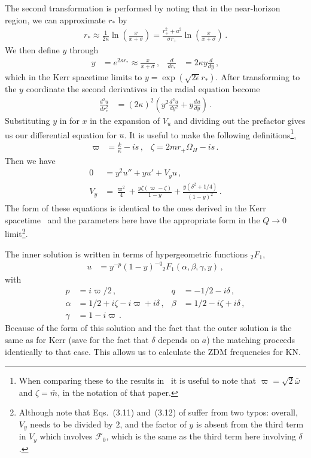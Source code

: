 \begin{refsection}
The second transformation is performed by noting that in the near-horizon region, we can approximate $r_*$ by
\begin{align}
r_* \approx \frac{1}{2\kappa}  \ln \left(\frac{x}{x+\sigma} \right) = \frac{r_+^2 +a^2}{\sigma r_+} \ln \left(\frac{x}{x+\sigma} \right) \,.
\end{align}
We then define $y$ through
\begin{align}
y & = e^{2 \kappa r_* } \approx \frac{x}{x+\sigma} \,, &
\frac{d}{dr_*} & = 2 \kappa y \frac{d}{dy} \,,
\end{align}
which in the Kerr spacetime limits to $y = \exp(\sqrt{2 \epsilon} r_*)$. 
After transforming to the $y$ coordinate the second derivatives in the radial equation become
\begin{align}
\frac{d^2 u}{dr_*^2} & = \left( 2 \kappa \right)^2 \left(y^2 \frac{d^2 u}{dy^2} + y \frac{d u}{dy} \right) \,.
\end{align}
Substituting $y$ in for $x$ in the expansion of $V_u$ and dividing out the prefactor gives us our differential equation for $u$. 
It is useful to make the following 
definitions\footnote{When comparing these to the results in~\cite{Yang:2013uba} it is useful to note that  $\varpi = \sqrt{2} \bar \omega$ and $\zeta = \bar m$, in the notation of that paper.},
\begin{align}
\varpi & = \frac{k}{\kappa}  - i s \,, &  \zeta = 2 m r_+  \Omega_H - i s \,.
\end{align}
Then we have
\begin{align}
\label{eq:NHdiffeq}
0 & = y^2  u'' + y u' + V_y u  \,, \\
\label{eq:Ypot}
 V_y & = \frac{\varpi^2}{4} + \frac{y \zeta (\varpi -\zeta)}{1-y} + \frac{y(\delta^2 + 1/4)}{(1-y)^2} \,.
\end{align}
The form of these equations is identical to the ones derived in the Kerr spacetime~\cite{Yang:2013uba} and the parameters here have the appropriate form in the $Q \to 0$ 
limit\footnote{Although note that Eqs.~(3.11) and~(3.12) of \cite{Yang:2013uba} suffer from two typos: overall, $V_y$ needs to be divided by $2$, and the factor of $y$ is absent from the third term in $V_y$ which involves $\mathcal F_0$, which is the same as the third term here involving $\delta$.}. 

The inner solution is written in terms of hypergeometric functions ${}_2 F_1$,
\begin{align}
\label{eq:NHsln}
u & = y^{-p} (1-y)^{-q} {}_2 F_1 ( \alpha, \beta, \gamma, y)\,,
\end{align}
with 
\begin{align}
p & = i \varpi/2 \,, & q & = -1/2-i\delta \,, \\
\alpha & = 1/2 + i \zeta - i \varpi + i \delta \,, & \beta & = 1/2 -i \zeta + i \delta \,, \\
\gamma & = 1 - i \varpi \,.
\end{align}
Because of the form of this solution and the fact that the outer solution is the same as for Kerr (save for the fact that $\delta$ depends on $a$) the matching proceeds identically to that case. This allows us to calculate the ZDM frequencies for KN.


\end{refsection}
